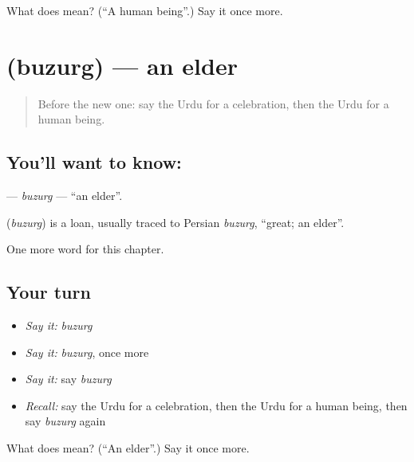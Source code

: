 \begin{tcolorbox}[breakable,colback=teal!4,colframe=teal!35!black,title={Before you move on}]
What does  mean? (\textquotedblleft{}A human being\textquotedblright{}.) Say it once more.
\end{tcolorbox}
\section[\texorpdfstring{\ur{بزرگ} (buzurg)}{بزرگ (buzurg)}]{ (buzurg) — an elder}

\label{lesson:UR-C170-buzurg}



\begin{quote}
Before the new one: say the Urdu for a celebration, then the Urdu for a human being.
\end{quote}

\subsection*{You'll want to know: }
\textbf{} — \emph{buzurg} — \textquotedblleft{}an elder\textquotedblright{}.

\begin{cousinweb}
\textbf{} (\emph{buzurg}) is a loan, usually traced to Persian \emph{buzurg}, \textquotedblleft{}great; an elder\textquotedblright{}.
\end{cousinweb}

\begin{grammarlens}[title={What you've built}]
One more word for this chapter.
\end{grammarlens}

\subsection*{Your turn}
\begin{itemize}
\raggedright
  \item \emph{Say it:} \emph{buzurg}
  \item \emph{Say it:} \emph{buzurg}, once more
  \item \emph{Say it:} say \emph{buzurg}
  \item \emph{Recall:} say the Urdu for a celebration, then the Urdu for a human being, then say \emph{buzurg} again
\end{itemize}

\begin{tcolorbox}[breakable,colback=teal!4,colframe=teal!35!black,title={Before you move on}]
What does  mean? (\textquotedblleft{}An elder\textquotedblright{}.) Say it once more.
\end{tcolorbox}
